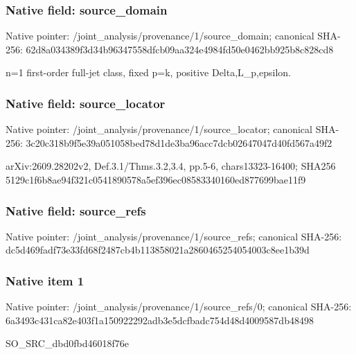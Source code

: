 \documentclass[10pt,a4paper]{article}
\begin{document}
\subsubsection{Native field: source\_\allowbreak{}domain}
Native pointer: /joint\_\allowbreak{}analysis/provenance/1/source\_\allowbreak{}domain; canonical SHA-256: 62d8a034389f3d34b96347558dfcb09aa324e4984fd50e0462bb925b8c828cd8

\begingroup\raggedright\sloppy n=\allowbreak{}1 first-order full-jet class,\allowbreak{} fixed p=\allowbreak{}k,\allowbreak{} positive Delta,\allowbreak{}L\_\allowbreak{}p,\allowbreak{}epsilon.\par\endgroup

\subsubsection{Native field: source\_\allowbreak{}locator}
Native pointer: /joint\_\allowbreak{}analysis/provenance/1/source\_\allowbreak{}locator; canonical SHA-256: 3c20c318b9f5e39a051058bed78d1de3ba96acc7dcb02647047d40fd567a49f2

\begingroup\raggedright\sloppy arXiv:\allowbreak{}2609.28202v2,\allowbreak{} Def.3.1/\allowbreak{}Thms.3.2,\allowbreak{}3.4,\allowbreak{} pp.5-6,\allowbreak{} chars13323-16400;\allowbreak{} SHA256 5129c1f6b8ae94f321c0541890578a5ef396ec08583340160ed877699bae11f9\par\endgroup

\subsubsection{Native field: source\_\allowbreak{}refs}
Native pointer: /joint\_\allowbreak{}analysis/provenance/1/source\_\allowbreak{}refs; canonical SHA-256: dc5d469fadf73e33fd68f2487cb4b113858021a2860465254054003c8ee1b39d

\subsubsection{Native item 1}
Native pointer: /joint\_\allowbreak{}analysis/provenance/1/source\_\allowbreak{}refs/0; canonical SHA-256: 6a3493c431ca82e403f1a150922292adb3e5dcfbadc754d48d4009587db48498

\begingroup\raggedright\sloppy SO\_\allowbreak{}SRC\_\allowbreak{}dbd0fbd46018f76e\par\endgroup
\end{document}

